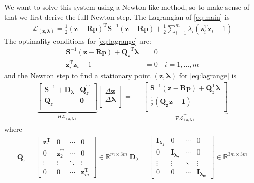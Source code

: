 \documentclass[14pt]{extarticle}
\newcommand*{\vv}[1]{\mathbf{#1}}
\newcommand{\T}{\text{T}}
\begin{document}
We want to solve this system using a Newton-like method, so to make sense of
that we first derive the full Newton step. The Lagrangian of \eqref{eq:main} is
\begin{align}
\mathcal{L}_{(\vv z, \vv \lambda)} = \frac{1}{2} \vv{(z-Rp)}^{\T} \vv S^{-1}
\vv{(z-Rp)} + \frac{1}{2} \sum_{i=1}^{m} \lambda_i (\vv z_i^{\T} \vv z_i - 1)
\label{eq:lagrange}
\end{align}
The optimality conditions for \eqref{eq:lagrange} are:
\begin{align*}
\vv S^{-1} (\vv z - \vv{Rp}) + \vv{Q_z}^{\T} \vv \lambda &= 0 \\
\vv z_i^{\T} \vv z_i - 1 &= 0 \quad i=1,\dots,m
\end{align*}
and the Newton step to find a stationary point $\vv{(z,\lambda)}$ for
\eqref{eq:lagrange} is
\begin{align}
\underbrace{
\begin{bmatrix}
\vv S^{-1}+\vv{D_\lambda} & \vv Q^{\T}_z \\
\vv Q_z & \vv 0 \\
\end{bmatrix}
}_{H \mathcal{L}_{(\vv z, \vv \lambda)}   }
\begin{bmatrix}
\Delta \vv z \\
\Delta \vv \lambda \\
\end{bmatrix}
=
\,-\underbrace{
\begin{bmatrix}
\vv S^{-1}(\vv z - \vv R \vv p) + \vv Q_z^{\T} \vv \lambda \\
\frac{1}{2}\vv{(Q_z z-1)} \\
\end{bmatrix}
}_{ \nabla \mathcal{L}_{(\vv z, \vv \lambda)}  } \label{eq:newton}
\end{align}
where
\begin{align*}
\vv Q_z=
\begin{bmatrix}
\vv z_1^{\T} & 0 & \cdots & 0 \\
0 & \vv z_2^{\T} & \cdots & 0 \\
\vdots & \vdots & \ddots & \vdots \\
0 & 0 & \cdots & \vv z_m^{\T}
\end{bmatrix}  \in \mathbb R^{ m\times 3m}
\; \vv D_\lambda  =
\begin{bmatrix}
\vv{I_{\lambda_1}} & 0 & \cdots & 0 \\
0 & \vv{I_{\lambda_2}} & \cdots & 0 \\
\vdots & \vdots & \ddots & \vdots \\
0 & 0 & \cdots & \vv{I_{\lambda_m}}
\end{bmatrix}
 \in \mathbb R^{3m\times 3m} \\
\end{align*}
\end{document}
